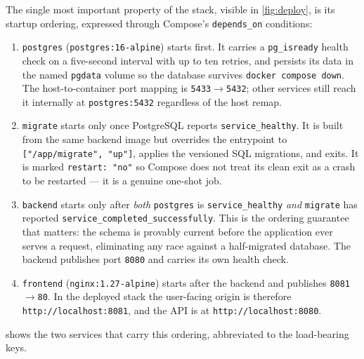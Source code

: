 

The single most important property of the stack, visible in \cref{fig:deploy}, is its startup ordering, expressed through Compose's \texttt{depends\_on} conditions:

\begin{enumerate}
  \item \texttt{postgres} (\texttt{postgres:16-alpine}) starts first. It carries a \texttt{pg\_isready} health check on a five-second interval with up to ten retries, and persists its data in the named \texttt{pgdata} volume so the database survives \texttt{docker compose down}. The host-to-container port mapping is \texttt{5433}$\rightarrow$\texttt{5432}; other services still reach it internally at \texttt{postgres:5432} regardless of the host remap.
  \item \texttt{migrate} starts only once PostgreSQL reports \texttt{service\_healthy}. It is built from the same backend image but overrides the entrypoint to \texttt{["/app/migrate", "up"]}, applies the versioned SQL migrations, and exits. It is marked \texttt{restart: "no"} so Compose does not treat its clean exit as a crash to be restarted --- it is a genuine one-shot job.
  \item \texttt{backend} starts only after \emph{both} \texttt{postgres} is \texttt{service\_healthy} \emph{and} \texttt{migrate} has reported \texttt{service\_completed\_successfully}. This is the ordering guarantee that matters: the schema is provably current before the application ever serves a request, eliminating any race against a half-migrated database. The backend publishes port \texttt{8080} and carries its own health check.
  \item \texttt{frontend} (\texttt{nginx:1.27-alpine}) starts after the backend and publishes \texttt{8081}$\rightarrow$\texttt{80}. In the deployed stack the user-facing origin is therefore \texttt{http://localhost:8081}, and the API is at \texttt{http://localhost:8080}.
\end{enumerate}

 shows the two services that carry this ordering, abbreviated to the load-bearing keys.

